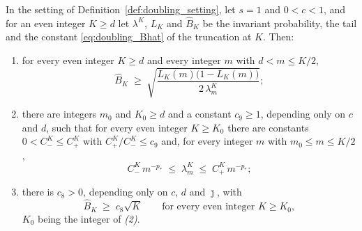 \begin{corollary}\label{cor:doubling_truncation}
In the setting of Definition~\ref{def:doubling_setting}, let $s=1$ and $0<c<1$, and for an even
integer $K\geq d$ let $\lambda^K$, $L_K$ and $\widehat B_K$ be the invariant probability, the
tail and the constant \eqref{eq:doubling_Bhat} of the truncation at $K$. Then:
\begin{enumerate}
    \item for every even integer $K\geq d$ and every integer $m$ with $d<m\leq K/2$,
    \begin{equation}\label{eq:doubling_percut_K}
        \widehat B_K\;\geq\;\sqrt{\frac{L_K(m)\bigl(1-L_K(m)\bigr)}{2\,\lambda^K_m}} ;
    \end{equation}
    \item there are integers $m_0$ and $K_0\geq d$ and a constant $c_9\geq1$, depending only
    on $c$ and $d$, such that for every even integer $K\geq K_0$ there are constants
    $0<C^K_-\leq C^K_+$ with $C^K_+/C^K_-\leq c_9$ and, for every integer $m$ with
    $m_0\leq m\leq K/2$,
    \begin{equation}\label{eq:doubling_decayK}
        C^K_-\,m^{-p_*}\;\leq\;\lambda^K_m\;\leq\;C^K_+\,m^{-p_*} ;
    \end{equation}
    \item there is $c_8>0$, depending only on $c$, $d$ and $\bar\jmath$, with
    \begin{equation}\label{eq:doubling_sqrtK}
        \widehat B_K\;\geq\;c_8\sqrt K\qquad\text{for every even integer }K\geq K_0 ,
    \end{equation}
    $K_0$ being the integer of \emph{(2)}.
\end{enumerate}
\end{corollary}

